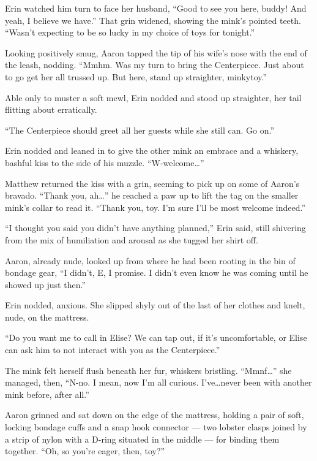 Erin watched him turn to face her husband, ``Good to see you here, buddy! And yeah, I believe we have.'' That grin widened, showing the mink's pointed teeth. ``Wasn't expecting to be so lucky in my choice of toys for tonight.''

Looking positively smug, Aaron tapped the tip of his wife's nose with the end of the leash, nodding. ``Mmhm. Was my turn to bring the Centerpiece. Just about to go get her all trussed up. But here, stand up straighter, minkytoy.''

Able only to muster a soft mewl, Erin nodded and stood up straighter, her tail flitting about erratically.

``The Centerpiece should greet all her guests while she still can. Go on.''

Erin nodded and leaned in to give the other mink an embrace and a whiskery, bashful kiss to the side of his muzzle. ``W-welcome\ldots{}''

Matthew returned the kiss with a grin, seeming to pick up on some of Aaron's bravado. ``Thank you, ah\ldots{}'' he reached a paw up to lift the tag on the smaller mink's collar to read it. ``Thank you, toy. I'm sure I'll be most welcome indeed.''

\secdiv

``I thought you said you didn't have anything planned,'' Erin said, still shivering from the mix of humiliation and arousal as she tugged her shirt off.

Aaron, already nude, looked up from where he had been rooting in the bin of bondage gear, ``I didn't, E, I promise. I didn't even know he was coming until he showed up just then.''

Erin nodded, anxious. She slipped shyly out of the last of her clothes and knelt, nude, on the mattress.

``Do you want me to call in Elise? We can tap out, if it's uncomfortable, or Elise can ask him to not interact with you as the Centerpiece.''

The mink felt herself flush beneath her fur, whiskers bristling. ``Mmnf\ldots{}'' she managed, then, ``N-no. I mean, now I'm all curious. I've\ldots{}never been with another mink before, after all.''

Aaron grinned and sat down on the edge of the mattress, holding a pair of soft, locking bondage cuffs and a snap hook connector --- two lobster clasps joined by a strip of nylon with a D-ring situated in the middle --- for binding them together. ``Oh, so you're eager, then, toy?''

